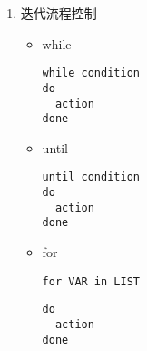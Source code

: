 \documentclass{TIJMUjiaoanSY}
\begin{document}
\begin{enumerate}
\begin{enumerate}
\begin{itemize}
	\vspace*{-10pt}

	\end{itemize}

      \item 迭代流程控制
	\vspace*{-10pt}
	\begin{multicols}{3}
	\begin{itemize}
	  \item while
\begin{verbatim}
while condition
do
  action
done
\end{verbatim}

	  \item until
\begin{verbatim}
until condition
do
  action
done
\end{verbatim}
	  \item for
\begin{verbatim}
for VAR in LIST
\end{verbatim}
\begin{verbatim}
do
  action
done
\end{verbatim}
	\end{itemize}
      \end{multicols}
	\vspace*{-10pt}
    \end{enumerate}


\end{enumerate}
\end{document}

